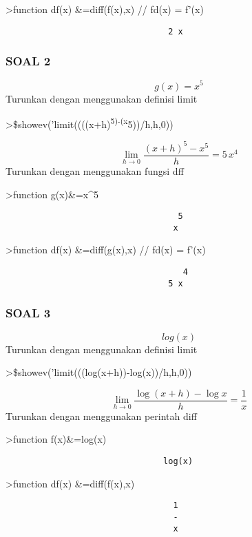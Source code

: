 \documentclass[
]{book}
\begin{document}
\textgreater function df(x) \&=diff(f(x),x) // fd(x) = f'(x)

\begin{verbatim}
                                 2 x
\end{verbatim}

\subsubsection{SOAL 2}\label{soal-2}

\[g(x) = x^5\]Turunkan dengan menggunakan definisi limit

\textgreater\$showev('limit((((x+h)\textsuperscript{5)-(x}5))/h,h,0))

\[\lim_{h\rightarrow 0}{\frac{\left(x+h\right)^5-x^5}{h}}=5\,x^4\]Turunkan dengan menggunakan fungsi dff

\textgreater function g(x)\&=x\^{}5

\begin{verbatim}
                                   5
                                  x
\end{verbatim}

\textgreater function df(x) \&=diff(g(x),x) // fd(x) = f'(x)

\begin{verbatim}
                                    4
                                 5 x
\end{verbatim}

\subsubsection{SOAL 3}\label{soal-3}

\[log(x)\]Turunkan dengan menggunakan definisi limit

\textgreater\$showev('limit(((log(x+h))-log(x))/h,h,0))

\[\lim_{h\rightarrow 0}{\frac{\log \left(x+h\right)-\log x}{h}}=  \frac{1}{x}\]Turunkan dengan menggunakan perintah diff

\textgreater function f(x)\&=log(x)

\begin{verbatim}
                                log(x)
\end{verbatim}

\textgreater function df(x) \&=diff(f(x),x)

\begin{verbatim}
                                  1
                                  -
                                  x
\end{verbatim}
\end{document}
